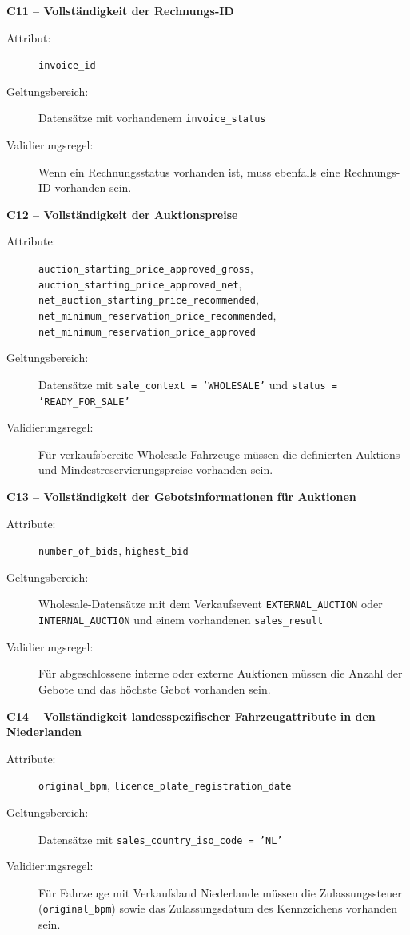 \documentclass[../main.tex]{subfiles}
\begin{document}
\medskip 
\noindent\textbf{C11 -- Vollständigkeit der Rechnungs-ID} 
\begin{description}  
    \item[Attribut:] \texttt{invoice\_id} 
    \item[Geltungsbereich:] Datensätze mit vorhandenem \texttt{invoice\_status} 
    \item[Validierungsregel:] Wenn ein Rechnungsstatus vorhanden ist, muss ebenfalls eine Rechnungs-ID vorhanden sein. 
\end{description} 

\medskip 
\noindent\textbf{C12 -- Vollständigkeit der Auktionspreise} 
\begin{description} 
    \item[Attribute:] \texttt{auction\_starting\_price\_approved\_gross}, \\ \texttt{auction\_starting\_price\_approved\_net}, \texttt{net\_auction\_starting\_price\_recommended}, \\ \texttt{net\_minimum\_reservation\_price\_recommended}, \\ \texttt{net\_minimum\_reservation\_price\_approved} 
    \item[Geltungsbereich:] Datensätze mit \texttt{sale\_context = 'WHOLESALE'} und \texttt{status = 'READY\_FOR\_SALE'} 
    \item[Validierungsregel:] Für verkaufsbereite Wholesale-Fahrzeuge müssen die definierten Auktions- und Mindestreservierungspreise vorhanden sein. 
\end{description} 

\medskip 
\noindent\textbf{C13 -- Vollständigkeit der Gebotsinformationen für Auktionen} 
\begin{description} 
    \item[Attribute:] \texttt{number\_of\_bids}, \texttt{highest\_bid} 
    \item[Geltungsbereich:] Wholesale-Datensätze mit dem Verkaufsevent \texttt{EXTERNAL\_AUCTION} oder \\ \texttt{INTERNAL\_AUCTION} und einem vorhandenen \texttt{sales\_result} 
    \item[Validierungsregel:] Für abgeschlossene interne oder externe Auktionen müssen die Anzahl der Gebote und das höchste Gebot vorhanden sein. 
\end{description} 

\medskip 
\noindent\textbf{C14 -- Vollständigkeit landesspezifischer Fahrzeugattribute in den Niederlanden} 
\begin{description} 
    \item[Attribute:] \texttt{original\_bpm}, \texttt{licence\_plate\_registration\_date} 
    \item[Geltungsbereich:] Datensätze mit \texttt{sales\_country\_iso\_code = 'NL'} 
    \item[Validierungsregel:] Für Fahrzeuge mit Verkaufsland Niederlande müssen die Zulassungssteuer (\texttt{original\_bpm}) sowie das Zulassungsdatum des Kennzeichens vorhanden sein. 
\end{description}
\end{document}
